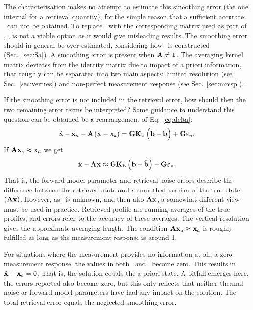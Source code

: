 The characterisation makes no attempt to estimate this smoothing error (the one
internal for a retrieval quantity), for the simple reason that a sufficient
accurate \aCvrMtr{\SttVct}\ can not be obtained. To replace \aCvrMtr{\SttVct}\
with the corresponding matrix used as part of \OEM, , is not a
viable option as it would give misleading results. The smoothing error should
in general be over-estimated, considering how \aCvrMtr{\SttVct}\ is constructed
(Sec.~\ref{sec:Sa}). A smoothing error is present when $\mathbf{A}\neq\mathbf{1}$.
The averaging kernel matrix deviates from the identity matrix due to impact of
a priori information, that roughly can be separated into two main aspects:
limited resolution (see Sec.~\ref{sec:vertres}) and non-perfect measurement
response (see Sec.~\ref{sec:mresp}).

If the smoothing error is not included in the retrieval error, how should then
the two remaining error terms be interpreted? Some guidance to understand this
question can be obtained be a rearrangement of Eq.~\ref{eq:delta}:
\begin{equation}
  \hat{\mathbf{x}} -\mathbf{x}_{a} - \mathbf{A}\left( \mathbf{x}-\mathbf{x}_{a} \right) = 
    \mathbf{G}\mathbf{K}_{\mathbf{b}}\left(\mathbf{b}-\hat{\mathbf{b}}\right) +
    \mathbf{G}\varepsilon_n.
\end{equation}
If $\mathbf{A}\mathbf{x}_{a}\approx\mathbf{x}_{a}$ we get
\begin{equation}
  \hat{\mathbf{x}} - \mathbf{A}\mathbf{x} \approx 
    \mathbf{G}\mathbf{K}_{\mathbf{b}}\left(\mathbf{b}-\hat{\mathbf{b}}\right) +
    \mathbf{G}\varepsilon_n.
\end{equation}
That is, the forward model parameter and retrieval noise errors describe the
difference between the retrieved state and a smoothed version of the true state
$(\mathbf{A}\mathbf{x})$. However, as \SttVct\ is unknown, and then also
$\mathbf{A}\mathbf{x}$, a somewhat different view must be used in practice.
Retrieved profile are running averages of the true profiles, and errors refer
to the accuracy of these averages. The vertical resolution gives the
approximate averaging length. The condition
$\mathbf{A}\mathbf{x}_{a}\approx\mathbf{x}_{a}$ is roughly fulfilled as long as the
measurement response is around 1.

For situations where the measurement provides no information at all, a zero
measurement response, the values in both \CtrFncMtr\ and \AvrKrnMtr\ become
zero. This results in $\hat{\mathbf{x}} - \mathbf{x}_{a} = 0$. That is, the solution equals
the a priori state. A pitfall emerges here, the errors reported also become
zero, but this only reflects that neither thermal noise or forward model
parameters have had any impact on the solution. The total retrieval error
equals the neglected smoothing error.




